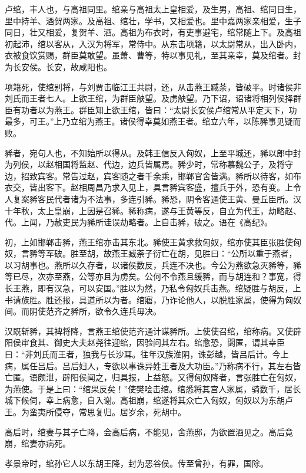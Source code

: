 \documentclass[]{article}
\begin{document}
卢绾，丰人也，与高祖同里。绾亲与高祖太上皇相爱，及生男，高祖、绾同日生，里中持羊、酒贺两家。及高祖、绾壮，学书，又相爱也。里中嘉两家亲相爱，生子同日，壮又相爱，复贺羊、酒。高祖为布衣时，有吏事避宅，绾常随上下。及高祖初起沛，绾以客从，入汉为将军，常侍中。从东击项籍，以太尉常从，出入卧内，衣被食饮赏赐，群臣莫敢望。虽萧、曹等，特以事见礼，至其亲幸，莫及绾者。封为长安侯。长安，故咸阳也。

项籍死，使绾别将，与刘贾击临江王共尉，还，从击燕王臧荼，皆破平。时诸侯非刘氏而王者七人。上欲王绾，为群臣觖望。及虏觖望。乃下诏，诏诸将相列侯择群臣有功者以为燕王。群臣知上欲王绾，皆曰：``太尉长安侯卢绾常从平定天下，功最多，可王。''上乃立绾为燕王。诸侯得幸莫如燕王者。绾立六年，以陈豨事见疑而败。

豨者，宛句人也，不知始所以得从。及韩王信反入匈奴，上至平城还，豨以郎中封为列侯，以赵相国将监赵、代边，边兵皆属焉。豨少时，常称慕魏公子，及将守边，招致宾客。常告过赵，宾客随之者千余乘，邯郸官舍皆满。豨所以待客，如布衣交，皆出客下。赵相周昌乃求入见上，具言豨宾客盛，擅兵于外，恐有变。上令人复案豨客民代者诸为不法事，多连引豨。豨恐，阴令客通使王黄、曼丘臣所。汉十年秋，太上皇崩，上因是召豨。豨称病，遂与王黄等反，自立为代王，劫略赵、代。上闻，乃赦吏民为豨所诖误劫略者。上自击豨，破之。语在《高纪》。

初，上如邯郸击豨，燕王绾亦击其东北。豨使王黄求救匈奴，绾亦使其臣张胜使匈奴，言豨等军破。胜至胡，故燕王臧荼子衍亡在胡，见胜曰：``公所以重于燕者，以习胡事也。燕所以久存者，以诸侯数反，兵连不决也。今公为燕欲急灭豨等，豨等已尽，次亦至燕，公等亦且为虏矣。公何不令燕且缓豨，而与胡连和？事宽，得长王燕，即有汉急，可以安国。''胜以为然，乃私令匈奴兵击燕。绾疑胜与胡反，上书请族胜。胜还报，具道所以为者。绾寤，乃诈论他人，以脱胜家属，使得为匈奴间。而阴使范齐之豨所，欲令久连兵毋决。

汉既斩豨，其裨将降，言燕王绾使范齐通计谋豨所。上使使召绾，绾称病。又使辟阳侯审食其、御史大夫赵尧往迎绾，因验问其左右。绾愈恐，閟匿，谓其幸臣曰：``非刘氏而王者，独我与长沙耳。往年汉族淮阴，诛彭越，皆吕后计。今上病，属任吕后。吕后妇人，专欲以事诛异姓王者及大功臣。''乃称病不行，其左右皆亡匿。语颇泄，辟阳侯闻之，归具报，上益怒。又得匈奴降者，言张胜亡在匈奴，为燕使。于是上曰：``绾果反矣！''使樊哙击绾。绾悉将其宫人家属，骑数千，居长城下候伺，幸上病愈，自入谢。高祖崩，绾遂将其众亡入匈奴，匈奴以为东胡卢王。为蛮夷所侵夺，常思复归。居岁余，死胡中。

高后时，绾妻与其子亡降，会高后病，不能见，舍燕邸，为欲置酒见之。高后竟崩，绾妻亦病死。

孝景帝时，绾孙它人以东胡王降，封为恶谷侯。传至曾孙，有罪，国除。
\end{document}
